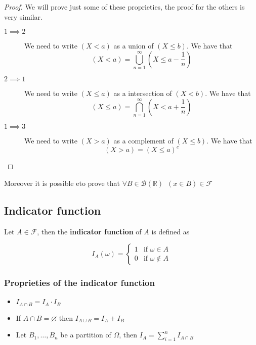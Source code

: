 \documentclass[10pt]{extarticle}
\newcommand{\R}{\mathbb{R}}
\newcommand{\F}{\mathcal{F}}
\begin{document}
\begin{proof}
    We will prove just some of these proprieties, the proof for the others is very similar.
    \begin{description}
        \item[$1 \implies 2$] We need to write $(X < a)$ as a union of $(X \leq b)$.
            We have that
            $$
                (X < a) = \bigcup_{n=1}^\infty (X \leq a - \frac{1}{n})
            $$
        \item[$2 \implies 1$] We need to write $(X \leq a)$ as a intersection of $(X < b)$.
            We have that
            $$
                (X \leq a) = \bigcap_{n=1}^\infty (X < a + \frac{1}{n})
            $$
        \item[$1 \implies 3$] We need to write $(X > a)$ as a complement of $(X \leq b)$.
            We have that
            $$
                (X > a) = (X \leq a)^c
            $$
    \end{description}
\end{proof}

Moreover it is possible eto prove that $\forall B \in \mathcal{B}(\R) \enspace (x \in B) \in \F$

\subsection{Indicator function}

Let $A \in \F$, then the \textbf{indicator function} of $A$ is defined as

$$
    I_A(\omega) =
    \begin{cases}
        1 & \text{if } \omega \in A    \\
        0 & \text{if } \omega \notin A
    \end{cases}
$$

\subsubsection{Proprieties of the indicator function}

\begin{itemize}
    \item $I_{A \cap B} = I_A \cdot I_B$
    \item If $A \cap B = \varnothing$ then $I_{A \cup B} = I_A + I_B$
    \item Let ${B_1, \ldots, B_n}$ be a partition of $\Omega$, then $I_A = \sum_{i = 1}^n I_{A \cap B}$
\end{itemize}
\end{document}
